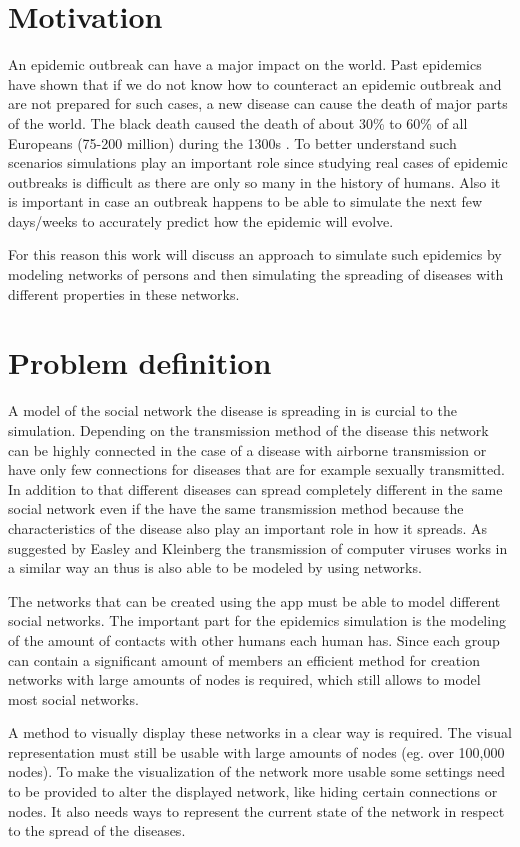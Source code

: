 \section{Motivation}
An epidemic outbreak can have a major impact on the world. Past epidemics have shown that
if we do not know how to counteract an epidemic outbreak and are not prepared for 
such cases, a new disease can cause the death of major parts of the world. The black
death caused the death of about 30\% to 60\% of all Europeans (75-200 million)
during the 1300s \cite{blackDeath}.
To better understand such scenarios simulations play an important role since studying real
cases of epidemic outbreaks is difficult as there are only so many in the history of humans.
Also it is important in case an outbreak happens to be able to simulate the next few days/weeks
to accurately predict how the epidemic will evolve.

For this reason this work will discuss an approach to simulate such epidemics by modeling
networks of persons and then simulating the spreading of diseases with different properties
in these networks.

\section{Problem definition}
A model of the social network the disease is spreading in is curcial to the simulation.
Depending on the transmission method of the disease this network can be highly connected in 
the case of a disease with airborne transmission or have only few connections for diseases
that are for example sexually transmitted. In addition to that different diseases can spread
completely different in the same social network even if the have the same transmission method
because the characteristics of the disease also play an important role in how it spreads. 
As suggested by Easley and Kleinberg \cite{networks}
the transmission of computer viruses works in a similar way an thus is also able to be modeled
by using networks.

The networks that can be created using the app must be able to model different social
networks. The important part for the epidemics simulation is the modeling of the amount
of contacts with other humans each human has. Since each group can contain a significant amount
of members an efficient method for creation networks with large amounts of nodes is required, which
still allows to model most social networks.

A method to visually display these networks in a clear way is required. The visual 
representation must still be usable with large amounts of nodes (eg. over 100,000 nodes).
To make the visualization of the network more usable some settings need to be provided
to alter the displayed network, like hiding certain connections or nodes. It also needs
ways to represent the current state of the network in respect to the spread of the diseases.


